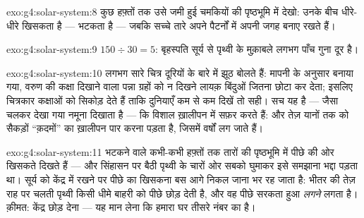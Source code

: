 \begin{solution}{exo:g4:solar-system:8}
कुछ हफ़्तों तक उसे जमी हुई चमकियों की पृष्ठभूमि में देखो:  उनके
बीच धीरे-धीरे खिसकता है --- भटकता है --- जबकि सच्चे तारे अपने
पैटर्नों में अपनी जगह बनाए रखते हैं।
\end{solution}

\begin{solution}{exo:g4:solar-system:9}
$150 \div 30 = 5$: बृहस्पति सूर्य से पृथ्वी के मुक़ाबले लगभग पाँच
गुना दूर है।
\end{solution}

\begin{solution}{exo:g4:solar-system:10}
लगभग सारे चित्र दूरियों के बारे में झूठ बोलते हैं: मापनी के अनुसार
बनाया गया, वरुण की कक्षा दिखाने वाला पन्ना ग्रहों को न दिखने लायक़
बिंदुओं जितना छोटा कर देता; इसलिए चित्रकार कक्षाओं को सिकोड़ देते हैं
ताकि दुनियाएँ कम से कम दिखें तो सही। सच यह है --- जैसा चलकर देखा गया
नमूना दिखाता है --- कि  विशाल ख़ालीपन में सफ़र करते हैं: 
और तेज़ यानों तक को सैकड़ों ``क़दमों'' का ख़ालीपन पार करना पड़ता है,
जिसमें वर्षों लग जाते हैं।
\end{solution}

\begin{solution}{exo:g4:solar-system:11}
भटकने वाले कभी-कभी हफ़्तों तक तारों की पृष्ठभूमि में पीछे की ओर
खिसकते दिखते हैं --- और सिंहासन पर बैठी पृथ्वी के चारों ओर सबको
घुमाकर इसे समझाना भद्दा पड़ता था। सूर्य को केंद्र में रखने पर पीछे का
खिसकना बस आगे निकल जाना भर रह जाता है: भीतर की तेज़ राह पर चलती
पृथ्वी किसी धीमे बाहरी  को पीछे छोड़ देती है, और वह  पीछे
सरकता हुआ \emph{लगने} लगता है। क़ीमत: केंद्र छोड़ देना --- यह मान
लेना कि हमारा घर तीसरे नंबर का  है।
\end{solution}
